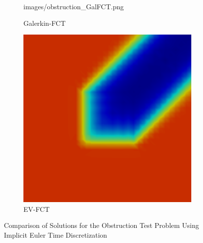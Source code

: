 \begin{figure}[ht]
\begin{subfigure}{0.3\textwidth}
        {images/obstruction_GalFCT.png}
      \caption{Galerkin-FCT}
   \end{subfigure}
   \begin{subfigure}{0.3\textwidth}
      \includegraphics[width=\textwidth]
        {images/obstruction_EVFCT.png}
      \caption{EV-FCT}
   \end{subfigure}
   \caption{Comparison of Solutions for the Obstruction Test
     Problem Using Implicit Euler Time Discretization}
   \label{fig:obstruction_be}
\end{figure}
\clearpage
